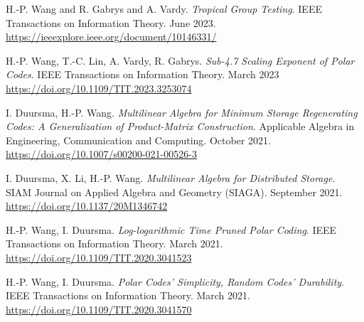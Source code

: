 \documentclass{article}
\def\section#1{$ $\\\textbf{\fs2#1}}
\def\fs#1{%
        \pgfmathsetmacro\a{#1}%
        \pgfmathsetmacro\A{10 * 1.2^\a}%
        \pgfmathsetmacro\B{\A * 1.25}%
        \fontsize{\A pt}{\B pt}\selectfont%
    }
\begin{document}
\bgroup
\def\section#1#2{}
\begin{thebibliography}{9}
    \bibitem{}
    H.-P. Wang and R. Gabrys and A. Vardy.
    \emph{Tropical Group Testing}.
    IEEE Transactions on Information Theory.
    June 2023.
    \url{https://ieeexplore.ieee.org/document/10146331/}

    \bibitem{}
    H.-P. Wang, T.-C. Lin, A. Vardy, R. Gabrys.
    \emph{Sub-4.7 Scaling Exponent of Polar Codes}.
    IEEE Transactions on Information Theory.
    March 2023
    \url{https://doi.org/10.1109/TIT.2023.3253074}

    \bibitem{}
    I. Duursma, H.-P. Wang.
    \emph{Multilinear Algebra for Minimum Storage Regenerating Codes:
        A Generalization of Product-Matrix Construction}.
    Applicable Algebra in Engineering, Communication and Computing.
    October 2021.
    \url{https://doi.org/10.1007/s00200-021-00526-3}

    \bibitem{}
    I. Duursma, X. Li, H.-P. Wang.
    \emph{Multilinear Algebra for Distributed Storage}.
    SIAM Journal on Applied Algebra and Geometry (SIAGA).
    September 2021.
    \url{https://doi.org/10.1137/20M1346742}

    \bibitem{}
    H.-P. Wang, I. Duursma.
    \emph{Log-logarithmic Time Pruned Polar Coding}.
    IEEE Transactions on Information Theory.
    March 2021.
    \url{https://doi.org/10.1109/TIT.2020.3041523}

    \bibitem{}
    H.-P. Wang, I. Duursma.
    \emph{Polar Codes' Simplicity, Random Codes' Durability}.
    IEEE Transactions on Information Theory.
    March 2021.
    \url{https://doi.org/10.1109/TIT.2020.3041570}
\end{thebibliography}
\end{document}
